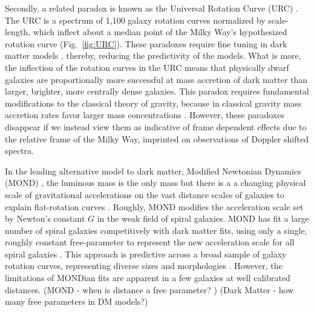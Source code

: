 \documentclass[reprint,%
 amsmath,amssymb,
 aps,
]{revtex4-1}
\begin{document}
 
 Secondly, a related paradox  is known as  the Universal Rotation Curve (URC)  \cite{salucci,Persic,1978Rubin,10.1111/j.1365-2966.2007.11696.x}. The URC is  a spectrum of 1,100 galaxy rotation curves normalized by scale-length, which inflect about a median point of the Milky Way's hypothesized rotation curve (Fig.~\ref{fig:URC}). 
 These paradoxes require   fine tuning in dark matter models \cite{MCGAUGH2021220}, thereby,  reducing  the predictivity of the models. 
 What is more, the
  inflection of the rotation curves in the URC means that physically    dwarf galaxies are proportionally more successful at mass accretion of dark matter   than      larger, brighter, more centrally dense    galaxies. 
 This paradox    requires fundamental modifications to the classical theory of gravity, because in classical gravity mass accretion rates favor   larger mass concentrations \cite{10.1093/mnras/stt2403}.  However,    these paradoxes disappear if we instead view them as indicative of  frame dependent effects due to  the relative frame of the   Milky Way, imprinted 
 on observations of Doppler shifted spectra. 
 
 In the   leading   alternative  model  to dark matter,   Modified Newtonian Dynamics (MOND) \cite{Milgrom},   the   luminous mass is the only mass  but   there is a 
     a changing  physical scale of gravitational accelerations  on the vast distance scales of galaxies to explain flat-rotation curves \cite{McGaugh_2014}. 
     Roughly, MOND modifies the acceleration scale   set by Newton's constant $G$ in the weak field of spiral galaxies. MOND has fit a large number of spiral galaxies competitively with dark matter fits, using only   a single, roughly constant free-parameter to represent the new acceleration scale for all spiral   galaxies  \cite{McGaugh2016RAR,2022A&A...664A..40M}. 
    This approach  is   predictive across a  broad  sample of galaxy rotation curves,  representing diverse    sizes and morphologies \cite{2016Lelli}. However, the limitations of MONDian fits  are apparent in a few galaxies at well calibrated distances.  {\color{blue}(MOND - when is distance a free parameter? )}  {\color{blue}(Dark Matter - how many free parameters in DM models?)}
  
\end{document}
